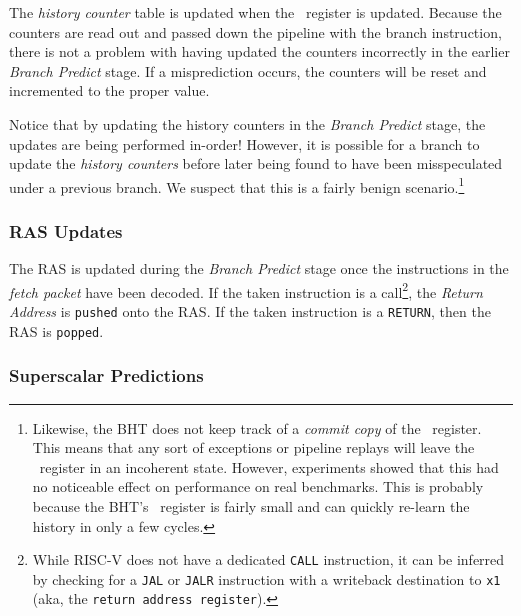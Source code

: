 The {\em history counter} table is updated when the \ghistory\ register is updated.  Because the counters are read out and passed down the pipeline with the branch instruction, there is not a problem with having updated the counters incorrectly in the earlier {\em Branch Predict} stage. If a misprediction occurs, the counters will be reset and incremented to the proper value.

Notice that by updating the history counters in the {\em Branch Predict} stage, the updates are being performed in-order!  However, it is possible for a branch to update the {\em history counters} before later being found to have been misspeculated under a previous branch. We suspect that this is a fairly benign scenario.\footnote{Likewise, the BHT does not keep track of a {\em commit copy} of the \ghistory\ register.  This means that any sort of exceptions or pipeline replays will leave the \ghistory\ register in an incoherent state.  However, experiments showed that this had no noticeable effect on performance on real benchmarks.  This is probably because the BHT's \ghistory\ register is fairly small and can quickly re-learn the history in only a few cycles.}


\subsubsection{RAS Updates}

The RAS is updated during the {\em Branch Predict} stage once the instructions in the {\em fetch packet} have been decoded. If the taken instruction is a call\footnote{While RISC-V does not have a dedicated {\tt {CALL}} instruction, it can be inferred by checking for a {\tt {JAL}} or {\tt {JALR}} instruction with a writeback destination to {\tt {x1}} (aka, the {\tt {return address register}}).}, the {\em Return Address} is {\tt {pushed}} onto the RAS. If the taken instruction is a {\tt {RETURN}}, then the RAS is {\tt {popped}}.

\subsubsection{Superscalar Predictions}


